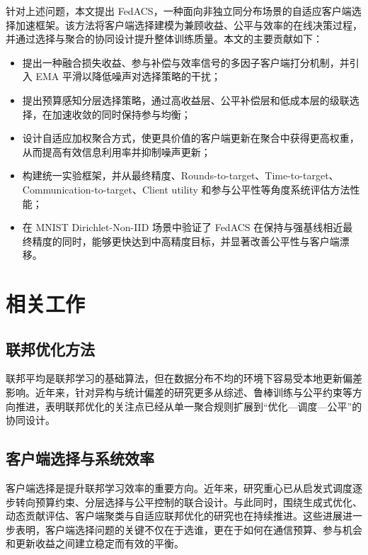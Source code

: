 \documentclass[UTF8,11pt]{ctexart}
\begin{document}
针对上述问题，本文提出 FedACS，一种面向非独立同分布场景的自适应客户端选择加速框架。该方法将客户端选择建模为兼顾收益、公平与效率的在线决策过程，并通过选择与聚合的协同设计提升整体训练质量。本文的主要贡献如下：
\begin{itemize}
  \item 提出一种融合损失收益、参与补偿与效率信号的多因子客户端打分机制，并引入 EMA 平滑以降低噪声对选择策略的干扰；
  \item 提出预算感知分层选择策略，通过高收益层、公平补偿层和低成本层的级联选择，在加速收敛的同时保持参与均衡；
  \item 设计自适应加权聚合方式，使更具价值的客户端更新在聚合中获得更高权重，从而提高有效信息利用率并抑制噪声更新；
  \item 构建统一实验框架，并从最终精度、Rounds-to-target、Time-to-target、Communication-to-target、Client utility 和参与公平性等角度系统评估方法性能；
  \item 在 MNIST Dirichlet-Non-IID 场景中验证了 FedACS 在保持与强基线相近最终精度的同时，能够更快达到中高精度目标，并显著改善公平性与客户端漂移。
\end{itemize}

\section{相关工作}
\subsection{联邦优化方法}
联邦平均是联邦学习的基础算法\cite{mcmahan2017communication}，但在数据分布不均的环境下容易受本地更新偏差影响。近年来，针对异构与统计偏差的研究更多从综述、鲁棒训练与公平约束等方向推进\cite{fu2023client,huang2024federated,liu2024recent,shi2023towards}，表明联邦优化的关注点已经从单一聚合规则扩展到“优化—调度—公平”的协同设计。

\subsection{客户端选择与系统效率}
客户端选择是提升联邦学习效率的重要方向。近年来，研究重心已从启发式调度逐步转向预算约束、分层选择与公平控制的联合设计\cite{fu2023client,perazzone2024communication,yan2024criticalfl,li2024adafl,wang2025resource}。与此同时，围绕生成式优化、动态贡献评估、客户端聚类与自适应联邦优化的研究也在持续推进\cite{chen2024gradient,zeng2024fedclust,lee2025efficient,wang2024fedgma}。这些进展进一步表明，客户端选择问题的关键不仅在于选谁，更在于如何在通信预算、参与机会和更新收益之间建立稳定而有效的平衡。
\end{document}
